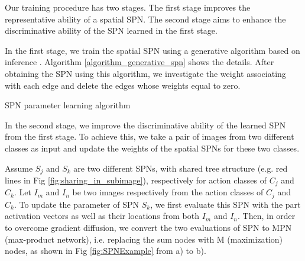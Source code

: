 \documentclass[journal]{IEEEtran}
\begin{document}
Our training procedure has two stages. The first stage improves the representative ability of a spatial SPN. The second stage aims to enhance the discriminative ability of the SPN learned in the first stage.


In the first stage, we train the spatial SPN using a generative algorithm based on inference \cite{poon2011SPNIntroduce}. Algorithm \ref{algorithm_generative_spn} shows the details. After obtaining the SPN using this algorithm, we investigate the weight associating with each edge and delete the edges whose weights equal to zero. 



\begin{algorithm}[h]

	\caption{SPN parameter learning algorithm}
	\label{algorithm_generative_spn}
\end{algorithm}


In the second stage, we improve the discriminative ability of the learned SPN from the first stage. To achieve this, we take a pair of images from two different classes as input and update the weights of the spatial SPNs for these two classes.


Assume $ S_j $ and $ S_k $ are two different SPNs, with shared tree structure (e.g. red lines in Fig \ref{fig:sharing_in_subimage}), respectively for action classes of $ C_j $ and $ C_k $. Let $ I_m $ and $ I_n $ be two images respectively from the action classes of $ C_j $ and $ C_k $. To update the parameter of SPN $ S_k $, we first evaluate this SPN with the part activation vectors as well as their locations from both $ I_m $ and $ I_n $. Then, in order to overcome gradient diffusion, we convert the two evaluations of SPN to MPN (max-product network), i.e. replacing the sum nodes with M (maximization) nodes, as shown in Fig \ref{fig:SPNExample} from a) to b).
\end{document}
